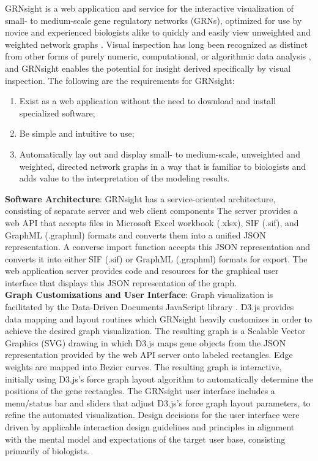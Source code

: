 \documentclass[sigconf,review]{acmart}
\begin{document}
GRNsight is a web application and service for the interactive visualization of small- to medium-scale gene regulatory networks (GRNs), optimized for use by novice and experienced biologists alike to quickly and easily view unweighted and weighted network graphs \cite{peerj}. Visual inspection has long been recognized as distinct from other forms of purely numeric, computational, or algorithmic data analysis \cite{Tufte:1986:VDQ:33404, card1999readings}, and GRNsight enables the potential for insight derived specifically by visual inspection. The following are the requirements for GRNsight:

\begin{enumerate}
\item Exist as a web application without the need to download and install specialized software;
\item Be simple and intuitive to use;
\item Automatically lay out and display small- to medium-scale, unweighted and weighted, directed network graphs in a way that is familiar to biologists and adds value to the interpretation of the modeling results.
\end{enumerate} 

\textbf{Software Architecture}: GRNsight has a service-oriented architecture, consisting of separate server and web client components The server provides a web API that accepts files in Microsoft Excel workbook (.xlsx), SIF (.sif), and GraphML (.graphml) formats and converts them into a unified JSON representation. A converse import function accepts this JSON representation and converts it into either SIF (.sif) or GraphML (.graphml) formats for export. The web application server provides code and resources for the graphical user interface that displays this JSON representation of the graph.\\

\textbf{Graph Customizations and User Interface}: Graph visualization is facilitated by the Data-Driven Documents JavaScript library \cite{d3}. D3.js provides data mapping and layout routines which GRNsight heavily customizes in order to achieve the desired graph visualization. The resulting graph is a Scalable Vector Graphics (SVG) drawing in which D3.js maps gene objects from the JSON representation provided by the web API server onto labeled rectangles. Edge weights are mapped into Bezier curves. The resulting graph is interactive, initially using D3.js's force graph layout algorithm to automatically determine the positions of the gene rectangles. The GRNsight user interface includes a menu/status bar and sliders that adjust D3.js's force graph layout parameters, to refine the automated visualization. Design decisions for the user interface were driven by applicable interaction design guidelines and principles \cite{norman2013design,shneiderman2010designing,nielsen1994usability} in alignment with the mental model and expectations of the target user base, consisting primarily of biologists.
\end{document}

